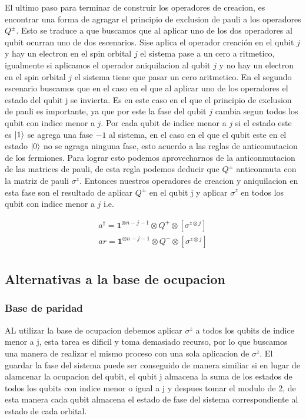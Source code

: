 \documentclass[12pt, oneside]{article}
\begin{document}
El ultimo paso para terminar de construir los operadores de creacion, es encontrar una forma de agragar el principio de exclusion de pauli a los operadores $Q^{\pm}$. Esto se traduce a que buscamos que al aplicar uno de los dos operadores al qubit ocurran uno de dos escenarios. Sise aplica el operador creación en el qubit $j$ y hay un electron en el spin orbital $j$ el sistema pase a un cero a ritmetico, igualmente si aplicamos el operador aniquilacion al qubit $j$ y no hay un electron en el spin orbital $j$ el sistema tiene que pasar un cero aritmetico. En el segundo escenario buscamos que en el caso en el que al aplicar uno de los operadores el estado del qubit j se invierta. Es en este caso en el que el principio de exclusion de pauli es importante, ya que por este la fase del qubit $j$ cambia segun todos los qubit con indice menor a $j$. Por cada qubit de indice menor a $j$ si el estado este es $\ket{1}$ se agrega una fase $-1$ al sistema, en el caso en el que el qubit este en el estado $\ket{0}$ no se agraga ninguna fase, esto acuerdo a las reglas de anticomutacion de los fermiones. Para lograr esto podemos aprovecharnos de la anticonmutacion de las matrices de pauli, de esta regla podemos deducir que $Q^{\pm}$ anticonmuta con la matriz de pauli $\sigma^z$. Entonces nuestros operadores de creacion y aniquilacion en esta fase son el resultado de aplicar $Q^{\pm}$ en el qubit j y aplicar $\sigma^z$ en todos los qubit con indice menor a $j$ i.e. \cite{bravyi2002fermionic}

\begin{equation}
    \begin{split}
        a^\dagger=\mathbf{1}^{\otimes n-j-1}\otimes Q^+\otimes\left[\sigma^{z\otimes j}\right]\\
        ar=\mathbf{1}^{\otimes n-j-1}\otimes Q^-\otimes\left[\sigma^{z\otimes j}\right]\\
    \end{split}
\end{equation}
\subsection{Alternativas a la base de ocupacion}
\subsubsection{Base de paridad}
AL utilizar la base de ocupacion debemos aplicar $\sigma^z$ a todos los qubits de indice menor a j, esta tarea es dificil y toma demasiado recurso, por lo que buscamos una manera de realizar el mismo proceso con una sola aplicacion de $\sigma^z$. El guardar la fase del sistema puede ser conseguido de manera similiar si en lugar de alamcenar la ocupacion del qubit, el qubit j almacena la suma de los estados de todos los qubits con indice menor o igual a j y despues tomar el modulo de 2, de esta manera cada qubit almacena el estado de fase del sistema correspondiente al estado de cada orbital.\\
\end{document}
